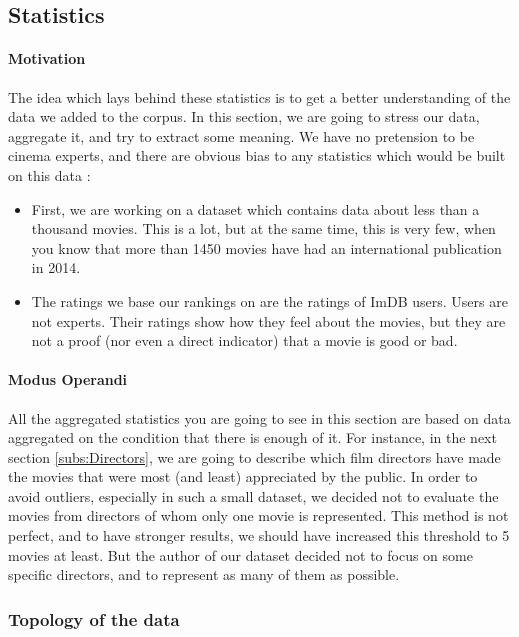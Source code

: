 \newpage
\subsection{Statistics}
\label{ssec:stats}

\paragraph{Motivation}
\label{par:Motivation}
The idea which lays behind these statistics is to get a better understanding of the data we added to the corpus.
In this section, we are going to stress our data, aggregate it, and try to extract some meaning.
We have no pretension to be cinema experts, and there are obvious bias to any statistics which would be built on this data :
\begin{itemize}
    \item First, we are working on a dataset which contains data about less than a thousand movies.
    This is a lot, but at the same time, this is very few, when you know that more than 1450 movies have had an international publication in 2014.
    \item The ratings we base our rankings on are the ratings of ImDB users. Users are not experts.
    Their ratings show how they feel about the movies, but they are not a proof (nor even a direct indicator) that a movie is good or bad.
\end{itemize}

\paragraph{Modus Operandi}
\label{par:ModusOperandi}
All the aggregated statistics you are going to see in this section are based on data aggregated on the condition that there is enough of it.
For instance, in the next section \ref{subs:Directors}, we are going to describe which film directors have made the movies that were most (and least) appreciated by the public.
In order to avoid outliers, especially in such a small dataset, we decided not to evaluate the movies from directors of whom only one movie is represented.
This method is not perfect, and to have stronger results, we should have increased this threshold to 5 movies at least.
But the author of our dataset decided not to focus on some specific directors, and to represent as many of them as possible.

\newpage
\subsubsection{Topology of the data}
\label{subs:Topology}

